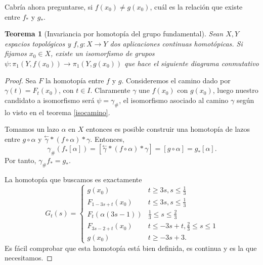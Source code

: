 \documentclass[12pt,a4paper]{book}
\newtheorem{thm}{Teorema}[section]
\theoremstyle{definition} \newtheorem{defn}[thm]{Definición}
\theoremstyle{definition} \newtheorem{ejemplo}[thm]{Ejemplo}
\theoremstyle{definition} \newtheorem{ejercicio}[thm]{Ejercicio}
\theoremstyle{remark} \newtheorem*{obs}{Observación}
\def\gf{\pi_1}
\newcommand\cev[1]{\overset{\leftarrow}{#1}}
\begin{document}
Cabría ahora preguntarse, si $f(x_0)\neq g(x_0)$, cuál es la relación que existe entre $f_*$ y $g_*$. 

\begin{thm}[Invariancia por homotopía del grupo fundamental]
  Sean $X,Y$ espacios topológicos y $f,g:X\rightarrow Y$ dos aplicaciones continuas homotópicas. Si fijamos $x_0\in X$, existe un isomorfismo de grupos $\psi:\gf(Y,f(x_0)) \rightarrow \gf(Y,g(x_0))$ que hace el siguiente diagrama conmutativo
  \begin{center}
   \end{center}
\end{thm}
\begin{proof}
  Sea $F$ la homotopía entre $f$ y $g$. Consideremos el camino dado por $\gamma(t)=F_t(x_0)$, con $t\in I$. Claramente $\gamma$ une $f(x_0)$ con $g(x_0)$, luego nuestro candidato a isomorfismo será $\psi=\gamma_{\#}$, el isomorfismo asociado al camino $\gamma$ según lo visto en el teorema \ref{isocamino}. 

Tomamos un lazo $\alpha$ en $X$ entonces es posible construir una homotopía de lazos entre $g\circ \alpha$ y $\cev{\gamma}*(f\circ \alpha)*\gamma$. Entonces, 
  \begin{equation*}
    \gamma_{\#}(f_*[\alpha])=[\cev{\gamma}*(f\circ \alpha)*\gamma]=[g\circ \alpha]=g_*[\alpha].
  \end{equation*}
  Por tanto, $\gamma_{\#}f_*=g_*$.

  La homotopía que buscamos es exactamente
  \begin{equation*}
    G_t(s)=
    \begin{cases}
      g(x_0) & t\geq3s, s\leq\tfrac{1}{3} \\
      F_{1-3s+t}(x_0) & t \leq3s, s\leq \tfrac{1}{3}\\
      F_{t}(\alpha(3s-1)) & \tfrac{1}{3} \leq s \leq \tfrac{2}{3} \\
      F_{3s-2+t}(x_0) & t\leq -3s+t, \tfrac{2}{3} \leq s \leq 1 \\
      g(x_0) & t\geq -3s+3.
    \end{cases}
  \end{equation*}
  Es fácil comprobar que esta homotopía está bien definida, es continua y es la que necesitamos.
\end{proof}
\end{document}
